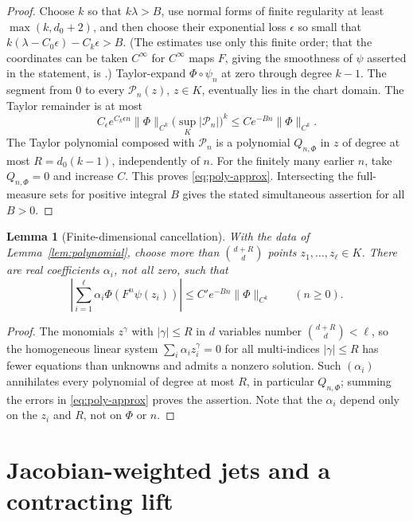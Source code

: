 \documentclass[11pt]{article}
\newtheorem{lemma}[theorem]{Lemma}
\theoremstyle{remark}
\begin{document}
\begin{proof}
Choose \(k\) so that \(k\lambda>B\), use normal forms of finite
regularity at least \(\max(k,d_0+2)\), and then choose their exponential
loss \(\epsilon\) so small that \(k(\lambda-C_0\epsilon)-C_k\epsilon>B\).
(The estimates use only this finite order; that the coordinates can
be taken \(C^\infty\) for \(C^\infty\) maps \(F\), giving the
smoothness of \(\psi\) asserted in the statement, is
\cite[Corollary~2.4]{KalininSadovskaya2017}.)
Taylor-expand \(\Phi\circ\psi_n\) at zero through degree \(k-1\).
The segment from \(0\) to every \(\mathcal P_n(z)\), \(z\in K\),
eventually lies in the chart domain.  The Taylor remainder is at most
\[
 C_\epsilon e^{C_k\epsilon n}\|\Phi\|_{C^k}
            \bigl(\sup_K|\mathcal P_n|\bigr)^k
 \le C e^{-Bn}\|\Phi\|_{C^k}.
\]
The Taylor polynomial composed with \(\mathcal P_n\) is a polynomial
\(Q_{n,\Phi}\) in \(z\) of degree at most
\(R=d_0(k-1)\), independently of \(n\).
For the finitely many earlier \(n\), take \(Q_{n,\Phi}=0\) and
increase \(C\).  This proves \eqref{eq:poly-approx}.
Intersecting the full-measure sets for positive integral \(B\)
gives the stated simultaneous assertion for all \(B>0\).
\end{proof}

\begin{lemma}[Finite-dimensional cancellation]\label{lem:finite}
With the data of Lemma~\ref{lem:polynomial}, choose more than
\(\binom{d+R}{d}\) points \(z_1,\ldots,z_\ell\in K\).
There are real coefficients \(\alpha_i\), not all zero, such that
\begin{equation}\label{eq:finite}
 \left|\sum_{i=1}^{\ell}\alpha_i\Phi(F^n\psi(z_i))\right|
      \le C' e^{-Bn}\|\Phi\|_{C^k}\qquad(n\ge0).
\end{equation}
\end{lemma}
\begin{proof}
The monomials \(z^\gamma\) with \(|\gamma|\le R\) in \(d\) variables
number \(\binom{d+R}{d}<\ell\), so the homogeneous linear system
\(\sum_i\alpha_i z_i^\gamma=0\) for all multi-indices \(|\gamma|\le R\) has
fewer equations than unknowns and admits a nonzero solution.
Such \((\alpha_i)\) annihilates every polynomial of degree at most
\(R\), in particular \(Q_{n,\Phi}\); summing the errors in
\eqref{eq:poly-approx} proves the assertion.  Note that the
\(\alpha_i\) depend only on the \(z_i\) and \(R\), not on \(\Phi\)
or \(n\).
\end{proof}

\section{Jacobian-weighted jets and a contracting lift}
\label{sec:jets}
\end{document}
